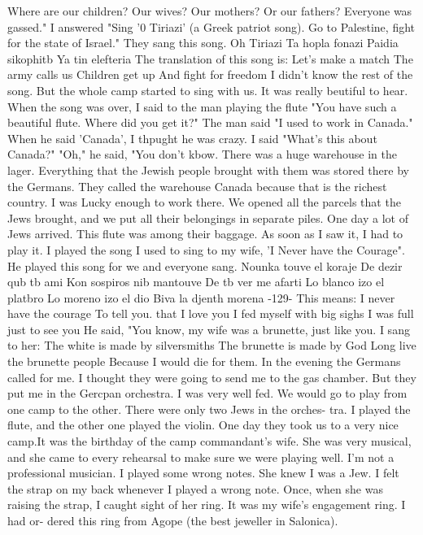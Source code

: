Where are our children?
Our wives?
Our mothers?
Or our fathers?
Everyone was gassed."
I answered "Sing '0 Tiriazi' (a Greek patriot song).
Go to Palestine, fight for 
the state of Israel."
They sang this song.
Oh Tiriazi 
Ta hopla fonazi 
Paidia sikophitb 
Ya tin elefteria 
The translation of this song is: 
Let's make a match 
The army calls us 
Children get up 
And fight for freedom 
I didn't know the rest of the song.
But the whole camp started to sing with us.
It 
was really beutiful to hear.
When the song was over, I said to the man playing the 
flute "You have such a beautiful flute.
Where did you get it?"
The man said "I used 
to work in Canada."
When he said 'Canada', I thpught he was crazy.
I said "What's 
this about Canada?"
"Oh," he said, "You don't kbow.
There was a huge warehouse in the 
lager.
Everything that the Jewish people brought with them was stored there by the 
Germans.
They called the warehouse Canada because that is the richest country.
I was 
Lucky enough to work there.
We opened all the parcels that the Jews brought, and we 
put all their belongings in separate piles.
One day a lot of Jews arrived.
This flute 
was among their baggage.
As soon as I saw it, I had to play it.
I played the song 
I used to sing to my wife, 'I Never have the Courage".
He played this song for we 
and everyone sang.
Nounka touve el koraje 
De dezir qub tb ami 
Kon sospiros nib mantouve 
De tb ver me afarti 
Lo blanco izo el platbro 
Lo moreno izo el dio 
Biva la djenth morena 
-129- 
This means: 
I never have the courage 
To tell you.
that I love you 
I fed myself with big sighs 
I was full just to see you 
He said, "You know, my wife was a brunette, just like you.
I sang to her: 
The white is made by silversmiths 
The brunette is made by God 
Long live the brunette people 
Because I would die for them.
In the evening the Germans called for me.
I thought they were going to send me to 
the gas chamber.
But they put me in the Gercpan orchestra.
I was very well fed.
We 
would go to play from one camp to the other.
There were only two Jews in the orches-
tra.
I played the flute, and the other one played the violin.
One day they took us 
to a very nice camp.It was the birthday of the camp commandant's wife.
She was very 
musical, and she came to every rehearsal to make sure we were playing well.
I'm 
not a professional musician.
I played some wrong notes.
She knew I was a Jew.
I 
felt the strap on my back whenever I played a wrong note.
Once, when she was raising 
the strap, I caught sight of her ring.
It was my wife's engagement ring.
I had or-
dered this ring from Agope (the best jeweller in Salonica).

